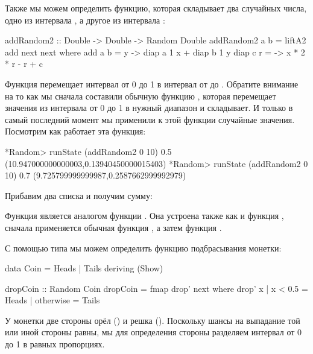Также мы можем определить функцию, которая складывает
два случайных числа, одно из интервала \In{[-1+a, 1+a]},
а другое из интервала \In{[-2+b,2+b]}:

\begin{code}
addRandom2 :: Double -> Double -> Random Double
addRandom2 a b = liftA2 add next next
    where add  a b = \x y -> diap a 1 x + diap b 1 y
          diap c r = \x   -> x * 2 * r - r + c
\end{code}

Функция  перемещает интервал от 0 до 1
в интервал от  до . Обратите внимание
на то как мы сначала составили обычную функцию
, которая перемещает значения из интервала
от 0 до 1 в нужный диапазон и складывает. И только
в самый последний момент мы применили к этой функции
случайные значения. Посмотрим как работает эта функция:

\begin{code}
*Random> runState (addRandom2 0 10) 0.5
(10.947000000000003,0.13940450000015403)
*Random> runState (addRandom2 0 10) 0.7
(9.725799999999987,0.2587662999992979)
\end{code}

Прибавим два списка и получим сумму:


Функция  является аналогом функции .
Она устроена также как и функция , сначала применяется
обычная функция , а затем функция .

С помощью типа  мы можем определить 
функцию подбрасывания монетки:

\begin{code}
data Coin = Heads | Tails
    deriving (Show)

dropCoin :: Random Coin
dropCoin = fmap drop' next
    where drop' x 
            | x < 0.5   = Heads
            | otherwise = Tails                    
\end{code}

У монетки две стороны орёл () и решка ().
Поскольку шансы на выпадание той или иной стороны равны, мы 
для определения стороны разделяем интервал от 0 до 1 в равных
пропорциях.

